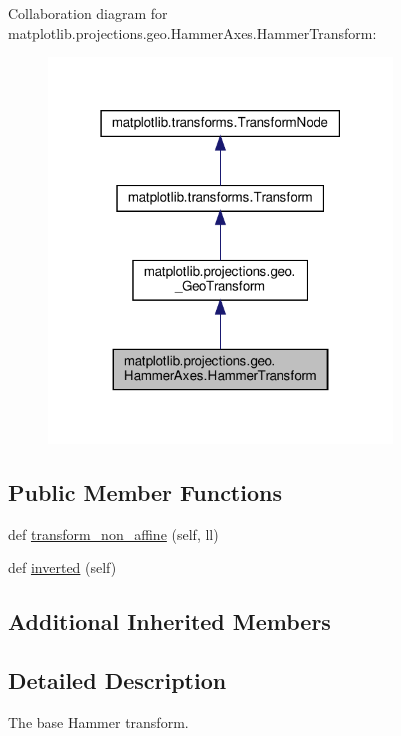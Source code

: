 Collaboration diagram for matplotlib.\+projections.\+geo.\+Hammer\+Axes.\+Hammer\+Transform\+:
\nopagebreak
\begin{figure}[H]
\begin{center}
\leavevmode
\includegraphics[width=259pt]{classmatplotlib_1_1projections_1_1geo_1_1HammerAxes_1_1HammerTransform__coll__graph}
\end{center}
\end{figure}
\subsection*{Public Member Functions}
\begin{DoxyCompactItemize}
\item 
def \hyperlink{classmatplotlib_1_1projections_1_1geo_1_1HammerAxes_1_1HammerTransform_a547ad5a53e5a359b657c75e54dbdb4d2}{transform\+\_\+non\+\_\+affine} (self, ll)
\item 
def \hyperlink{classmatplotlib_1_1projections_1_1geo_1_1HammerAxes_1_1HammerTransform_aea8830a15507a5fc3eb7356fbe359117}{inverted} (self)
\end{DoxyCompactItemize}
\subsection*{Additional Inherited Members}


\subsection{Detailed Description}
\begin{DoxyVerb}The base Hammer transform.\end{DoxyVerb}
 

